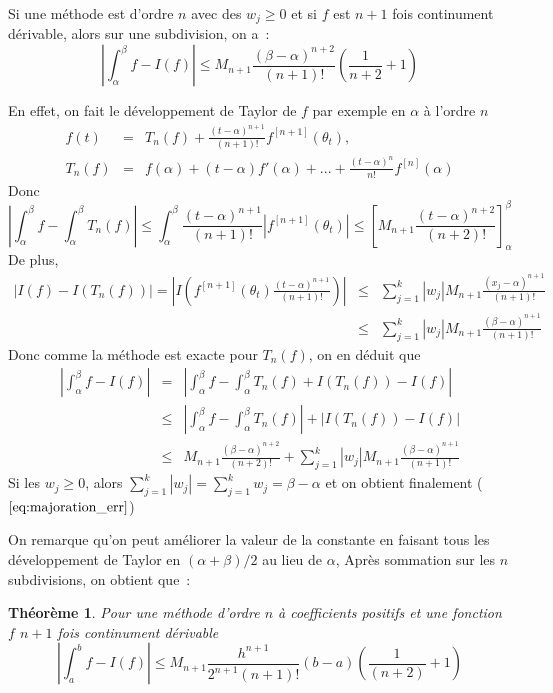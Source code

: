 \documentclass[a4paper,11pt]{book}
\newtheorem{thm}{Théorème}
\begin{document}
\begin{giacjshere}
Si une méthode est d'ordre $n$ avec des $w_j\geq 0$ et 
si $f$ est $n+1$ fois continument dérivable,
alors sur une subdivision, on a~:
\begin{equation} \label{eq:majoration_err}
|\int_{\alpha}^{\beta} f-I(f)| \leq M_{n+1} \frac{(\beta-\alpha)^{n+2}}{(n+1)!}
(\frac{1}{n+2}+1)
\end{equation}

En effet, on fait le développement de Taylor de $f$ par exemple
en $\alpha$ à l'ordre $n$
\begin{eqnarray*}
 f(t)&=&T_{n}(f)+\frac{(t-\alpha)^{n+1}}{(n+1)!} f^{[n+1]}(\theta_t),\\
 T_{n}(f)&=&f(\alpha)+(t-\alpha)f'(\alpha)+...+ 
\frac{(t-\alpha)^{n}}{n!} f^{[n]}(\alpha)
\end{eqnarray*}
Donc 
\[ |\int_{\alpha}^{\beta} f- \int_{\alpha}^{\beta} T_{n}(f)|
\leq \int_{\alpha}^{\beta} \frac{(t-\alpha)^{n+1}}{(n+1)!} |f^{[n+1]}(\theta_t)| 
\leq \left[ M_{n+1} \frac{(t-\alpha)^{n+2}}{(n+2)!} \right]_\alpha^\beta
\]
De plus, 
\begin{eqnarray*}
 |I(f) -I(T_n(f))| =|I\left( f^{[n+1]}(\theta_t)
  \frac{(t-\alpha)^{n+1}}{(n+1)!} \right)|
& \leq &  \sum_{j=1}^k |w_j| M_{n+1} \frac{(x_j-\alpha)^{n+1}}{(n+1)!} 
\\
& \leq & \sum_{j=1}^k |w_j| M_{n+1} \frac{(\beta-\alpha)^{n+1}}{(n+1)!}
\end{eqnarray*}
Donc comme la méthode est exacte pour $T_n(f)$, on en déduit que
\begin{eqnarray*}
|\int_{\alpha}^{\beta} f-I(f)|
&= &|\int_{\alpha}^{\beta} f-\int_{\alpha}^{\beta} T_n(f)+I(T_n(f))- I(f)| \\
&\leq& |\int_{\alpha}^{\beta} f-\int_{\alpha}^{\beta} T_n(f)|+|I(T_n(f))- I(f)|\\
&\leq & M_{n+1}  \frac{(\beta-\alpha)^{n+2}}{(n+2)!} +  
\sum_{j=1}^k |w_j| M_{n+1} \frac{(\beta-\alpha)^{n+1}}{(n+1)!} 
\end{eqnarray*}
Si les $w_j\geq 0$, alors $\sum_{j=1}^k |w_j|=\sum_{j=1}^k w_j=\beta-\alpha$
et on obtient finalement (\(\ref{eq:majoration_err}\))

On remarque qu'on peut am\'eliorer la valeur de la constante 
en faisant tous les d\'eveloppement de Taylor
en $(\alpha+\beta)/2$ au lieu de $\alpha$, 
Après sommation sur les $n$ subdivisions, on obtient que~:
\begin{thm}
Pour une méthode d'ordre $n$ à coefficients positifs et une fonction $f$
$n+1$ fois continument d\'erivable~
\[|\int_{a}^{b} f-I(f)| \leq M_{n+1} \frac{h^{n+1}}{2^{n+1}(n+1)!}  (b-a) 
(\frac{1}{(n+2)}+1)\]
\end{thm}


\end{giacjshere}
\end{document}
